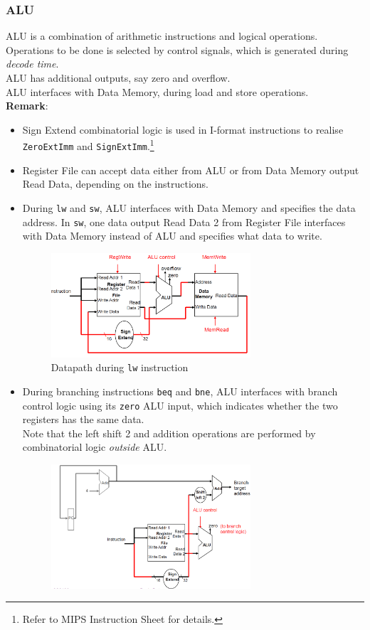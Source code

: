 \documentclass[12pt]{article}
\theoremstyle{definition}
\begin{document}
\subsubsection{ALU}
ALU is a combination of arithmetic instructions and logical operations. Operations to be done is selected by control signals, which is generated during \textit{decode time}.\\
ALU has additional outputs, say zero and overflow.\\
ALU interfaces with Data Memory, during load and store operations.\\
\textbf{Remark}:
\begin{itemize}
  \item Sign Extend combinatorial logic is used in I-format instructions to realise \texttt{ZeroExtImm} and \texttt{SignExtImm}.\footnote{Refer to MIPS Instruction Sheet for details.}
  \item Register File can accept data either from ALU or from Data Memory output Read Data, depending on the instructions.
  \item During \texttt{lw} and \texttt{sw}, ALU interfaces with Data Memory and specifies the data address. In \texttt{sw}, one data output Read Data 2 from Register File interfaces with Data Memory instead of ALU and specifies what data to write. 
\begin{figure}[h]
\centering
\includegraphics[width = 0.7\textwidth]{12_5.png}
\caption{Datapath during \texttt{lw} instruction}
\end{figure}
  \item During branching instructions \texttt{beq} and \texttt{bne}, ALU interfaces with branch control logic using its \texttt{zero} ALU input, which indicates whether the two registers has the same data.\\Note that the left shift 2 and addition operations are performed by combinatorial logic \textit{outside} ALU.
\begin{figure}[h]
\centering
\includegraphics[width = 0.7\textwidth]{12_6.png}

\end{figure}
\end{itemize}
\end{document}
